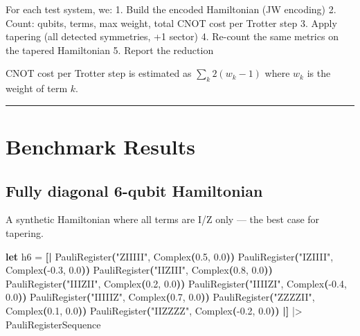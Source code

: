 \documentclass[
  11pt,
  oneside]{book}
\newenvironment{Shaded}{\begin{snugshade}}{\end{snugshade}}
\newcommand{\FloatTok}[1]{\textcolor[rgb]{0.00,0.00,0.81}{#1}}
\newcommand{\KeywordTok}[1]{\textcolor[rgb]{0.13,0.29,0.53}{\textbf{#1}}}
\newcommand{\NormalTok}[1]{#1}
\newcommand{\OperatorTok}[1]{\textcolor[rgb]{0.81,0.36,0.00}{\textbf{#1}}}
\newcommand{\StringTok}[1]{\textcolor[rgb]{0.31,0.60,0.02}{#1}}
\begin{document}
For each test system, we: 1. Build the encoded Hamiltonian (JW encoding)
2. Count: qubits, terms, max weight, total CNOT cost per Trotter step 3.
Apply tapering (all detected symmetries, +1 sector) 4. Re-count the same
metrics on the tapered Hamiltonian 5. Report the reduction

CNOT cost per Trotter step is estimated as \(\sum_k 2(w_k - 1)\) where
\(w_k\) is the weight of term \(k\).

\begin{center}\rule{0.5\linewidth}{0.5pt}\end{center}

\section{Benchmark Results}\label{benchmark-results}

\subsection{Fully diagonal 6-qubit
Hamiltonian}\label{fully-diagonal-6-qubit-hamiltonian}

A synthetic Hamiltonian where all terms are I/Z only --- the best case
for tapering.

\begin{Shaded}
\begin{Highlighting}[]
\KeywordTok{let}\NormalTok{ h6 =}
    \OperatorTok{[|}\NormalTok{ PauliRegister}\OperatorTok{(}\StringTok{"ZIIIII"}\NormalTok{, Complex}\OperatorTok{(}\FloatTok{0.5}\NormalTok{, }\FloatTok{0.0}\OperatorTok{))}
\NormalTok{       PauliRegister}\OperatorTok{(}\StringTok{"IZIIII"}\NormalTok{, Complex}\OperatorTok{(}\FloatTok{{-}0.3}\NormalTok{, }\FloatTok{0.0}\OperatorTok{))}
\NormalTok{       PauliRegister}\OperatorTok{(}\StringTok{"IIZIII"}\NormalTok{, Complex}\OperatorTok{(}\FloatTok{0.8}\NormalTok{, }\FloatTok{0.0}\OperatorTok{))}
\NormalTok{       PauliRegister}\OperatorTok{(}\StringTok{"IIIZII"}\NormalTok{, Complex}\OperatorTok{(}\FloatTok{0.2}\NormalTok{, }\FloatTok{0.0}\OperatorTok{))}
\NormalTok{       PauliRegister}\OperatorTok{(}\StringTok{"IIIIZI"}\NormalTok{, Complex}\OperatorTok{(}\FloatTok{{-}0.4}\NormalTok{, }\FloatTok{0.0}\OperatorTok{))}
\NormalTok{       PauliRegister}\OperatorTok{(}\StringTok{"IIIIIZ"}\NormalTok{, Complex}\OperatorTok{(}\FloatTok{0.7}\NormalTok{, }\FloatTok{0.0}\OperatorTok{))}
\NormalTok{       PauliRegister}\OperatorTok{(}\StringTok{"ZZZZII"}\NormalTok{, Complex}\OperatorTok{(}\FloatTok{0.1}\NormalTok{, }\FloatTok{0.0}\OperatorTok{))}
\NormalTok{       PauliRegister}\OperatorTok{(}\StringTok{"IIZZZZ"}\NormalTok{, Complex}\OperatorTok{(}\FloatTok{{-}0.2}\NormalTok{, }\FloatTok{0.0}\OperatorTok{))} \OperatorTok{|]}
\NormalTok{    |\textgreater{} PauliRegisterSequence}
\end{Highlighting}
\end{Shaded}
\end{document}
